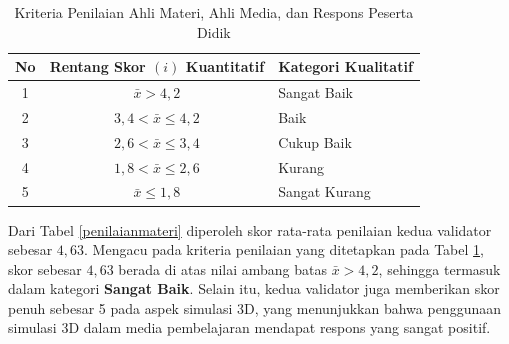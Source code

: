 \begin{enumerate}
    \begin{table}[H]
        \centering
        \caption{Kriteria Penilaian Ahli Materi, Ahli Media, dan Respons Peserta Didik}
        \label{tab:kriteriaahli}
        \begin{tabular}{|c|c|l|}
            \hline
            \textbf{No} & \textbf{Rentang Skor \( (i) \) Kuantitatif} & \textbf{Kategori Kualitatif}\\
            \hline
            1 & \( \bar{x} > 4{,}2 \) & Sangat Baik\\
            2 & \( 3{,}4 < \bar{x} \leq 4{,}2 \) & Baik\\
            3 & \( 2{,}6 < \bar{x} \leq 3{,}4 \) & Cukup Baik\\
            4 & \( 1{,}8 < \bar{x} \leq 2{,}6 \) & Kurang\\
            5 & \( \bar{x} \leq 1{,8} \) & Sangat Kurang\\
            \hline 
        \end{tabular}
    \end{table}
    \hspace*{1cm}Dari Tabel \ref{penilaianmateri} diperoleh skor rata-rata penilaian kedua validator sebesar \(4{,}63\). Mengacu pada kriteria penilaian yang ditetapkan pada Tabel \ref{tab:kriteriaahli}, skor sebesar \(4{,}63\) berada di atas nilai ambang batas \(\bar{x} > 4{,}2\), sehingga termasuk dalam kategori \textbf{Sangat Baik}. Selain itu, kedua validator juga memberikan skor penuh sebesar 5 pada aspek simulasi 3D, yang menunjukkan bahwa penggunaan simulasi 3D dalam media pembelajaran mendapat respons yang sangat positif.


\end{enumerate}

